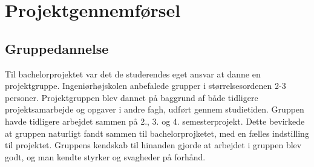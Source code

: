 \chapter{Projektgennemførsel}

\section{Gruppedannelse}
Til bachelorprojektet var det de studerendes eget ansvar at danne en projektgruppe. 
Ingeniørhøjskolen anbefalede grupper i størrelsesordenen 2-3 personer. Projektgruppen
blev dannet på baggrund af både tidligere projektsamarbejde og opgaver i andre fagh, udført gennem studietiden. 
Gruppen havde tidligere arbejdet sammen på 2., 3. og 4. semesterprojekt.
Dette bevirkede at gruppen naturligt fandt sammen til bachelorprojketet, med en fælles indstilling til projektet.
Gruppens kendskab til hinanden gjorde at arbejdet i gruppen blev godt, og man kendte styrker og svagheder på forhånd. \\